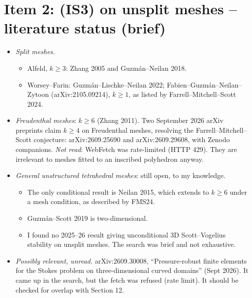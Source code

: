 \documentclass[11pt]{article}
\theoremstyle{remark}\newtheorem{remark}[theorem]{Remark}
\begin{document}
\section{Item 2: (IS3) on unsplit meshes -- literature status (brief)}
\begin{itemize}
\item \emph{Split meshes.}
 \begin{itemize}
 \item Alfeld, $k\ge3$: Zhang 2005 and Guzm\'an--Neilan 2018.
 \item Worsey--Farin: Guzm\'an--Lischke--Neilan 2022; Fabien--Guzm\'an--Neilan--Zytoon (arXiv:2105.09214), $k\ge1$, as listed by Farrell--Mitchell--Scott 2024.
 \end{itemize}
\item \emph{Freudenthal meshes}: $k\ge6$ (Zhang 2011). Two September 2026 arXiv preprints claim $k\ge4$ on Freudenthal meshes, resolving the Farrell--Mitchell--Scott conjecture: arXiv:2609.25690 and arXiv:2609.29608, with Zenodo companions. \emph{Not read}: WebFetch was rate-limited (HTTP 429). They are irrelevant to meshes fitted to an inscribed polyhedron anyway.
\item \emph{General unstructured tetrahedral meshes}: still open, to my knowledge.
 \begin{itemize}
 \item The only conditional result is Neilan 2015, which extends to $k\ge6$ under a mesh condition, as described by FMS24.
 \item Guzm\'an--Scott 2019 is two-dimensional.
 \item I found no 2025--26 result giving unconditional 3D Scott--Vogelius stability on unsplit meshes. The search was brief and not exhaustive.
 \end{itemize}
\item \emph{Possibly relevant, unread.} arXiv:2609.30008, ``Pressure-robust finite elements for the Stokes problem on three-dimensional curved domains'' (Sept 2026). It came up in the search, but the fetch was refused (rate limit). It should be checked for overlap with Section 12.
\end{itemize}
\end{document}
